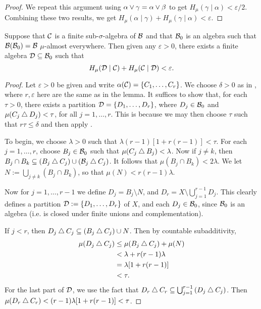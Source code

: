\begin{lemma}
\begin{proof}
		We repeat this argument using $\alpha \vee \gamma = \alpha \vee \beta$ to get $H_\mu(\gamma \mid \alpha) < \varepsilon / 2$. Combining these two results, we get $H_\mu(\alpha \mid \gamma) + H_\mu(\gamma \mid \alpha) < \varepsilon$.
	\end{proof}
\end{lemma}

\begin{theorem} \label{thm:walters-4-16}
	Suppose that $\mathcal{C}$ is a finite sub-$\sigma$-algebra of $\mathcal{B}$ and that $\mathcal{B}_0$ is an algebra such that $\mathcal{B}(\mathcal{B}_0) = \mathcal{B}$ $\mu$-almost everywhere. Then given any $\varepsilon > 0$, there exists a finite algebra $\mathcal{D} \subseteq \mathcal{B}_0$ such that
	\[
		H_\mu(\mathcal{D} \mid \mathcal{C}) + H_\mu(\mathcal{C} \mid \mathcal{D}) < \varepsilon.
	\]
	
	\begin{proof}
		Let $\varepsilon > 0$ be given and write $\alpha(\mathcal{C}) = \{C_1, \dots, C_r\}$. We choose $\delta > 0$ as in , where $r, \varepsilon$ here are the same as in the lemma. It suffices to show that, for each $\tau > 0$, there exists a partition $\mathcal{D} = \{D_1, \dots, D_r\}$, where $D_j \in \mathcal{B}_0$ and $\mu(C_j \bigtriangleup D_j) < \tau$, for all $j = 1, \dots, r$. This is because we may then choose $\tau$ such that $r\tau \leq \delta$ and then apply .
		
		To begin, we choose $\lambda > 0$ such that $\lambda(r - 1)[1 + r(r - 1)] < \tau$. For each $j = 1, \dots, r$, choose $B_j \in \mathcal{B}_0$ such that $\mu(C_j \bigtriangleup B_j) < \lambda$. Now if $j \neq k$, then $B_j \cap B_k \subseteq (B_j \bigtriangleup C_j) \cup (\mathcal{B}_j \bigtriangleup C_j)$. It follows that $\mu(B_j \cap B_k) < 2\lambda$. We let $N := \bigcup_{j \neq k}{(B_j \cap B_k)}$, so that $\mu(N) < r(r - 1)\lambda$.
		
		Now for $j = 1, \dots, r - 1$ we define $D_j = B_j \setminus N$, and $D_r = X \setminus \bigcup_{j = 1}^{r - 1}{D_j}$. This clearly defines a partition $\mathcal{D} := \{D_1, \dots, D_r\}$ of $X$, and each $D_j \in \mathcal{B}_0$, since $\mathcal{B}_0$ is an algebra (i.e. is closed under finite unions and complementation).
		
		If $j < r$, then $D_j \bigtriangleup C_j \subseteq (B_j \bigtriangleup C_j) \cup N$. Then by countable subadditivity,
		\begin{align*}
			\mu(D_j \bigtriangleup C_j) &\leq \mu(B_j \bigtriangleup C_j) + \mu(N) \\
				&< \lambda + r(r - 1)\lambda \\
				&= \lambda[1 + r(r - 1)] \\
				&< \tau.
		\end{align*}
		For the last part of $\mathcal{D}$, we use the fact that $D_r \bigtriangleup C_r \subseteq \bigcup_{j = 1}^{r - 1}{(D_j \bigtriangleup C_j)}$. Then $\mu(D_r \bigtriangleup C_r) < (r - 1)\lambda[1 + r(r - 1)] < \tau$.
	\end{proof}
\end{theorem}

